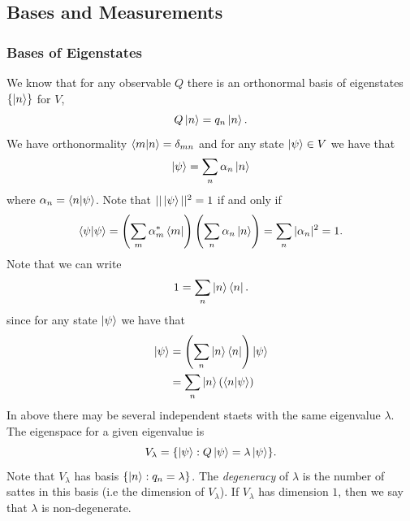 \documentclass{article}
\begin{document}
\subsection{Bases and Measurements}
\subsubsection{Bases of Eigenstates}
We know that for any observable $ Q $ there is an orthonormal basis of eigenstates $ \{\ket n\} $ for $ V $,
\[
  Q \ket n = q_n\ket n.
\]
We have orthonormality $ \bra{m}\ket{n} = \delta_{mn} $ and for any state $ \ket \psi \in V $ we have that
\[
  \ket \psi = \sum_n \alpha_n \ket n
\]
where $ \alpha_n = \bra{n}\ket{\psi} $. Note that $ ||\ket \psi||^2 = 1 $ if and only if
\[
	\bra{\psi}\ket{\psi} = \left(\sum_m \alpha_m^*\bra m\right)\left(\sum_n\alpha_n \ket n \right) = \sum_n |\alpha_n|^2 = 1.
\]
Note that we can write
\[
  1 = \sum_n \ket n \bra n.
\]
since for any state $ \ket \psi $ we have that
\begin{align*}
	\ket \psi &= \left(\sum_n \ket n \bra n\right)\ket \psi \\
		  &= \sum_n \ket n(\bra{n}\ket{\psi})
\end{align*}
In above there may be several independent staets with the same eigenvalue $ \lambda $. The eigenspace for a given eigenvalue is
\[
	V_\lambda = \{ \ket \psi : Q\ket \psi = \lambda \ket \psi\}.
\]
Note that $ V_\lambda $ has basis $ \{ \ket n : q_n = \lambda\} $. The \textit{degeneracy} of $ \lambda $ is the number of sattes in this basis (i.e the dimension of $ V_\lambda $). If $ V_\lambda $ has dimension $ 1 $, then we say that $ \lambda $ is non-degenerate.
\end{document}
